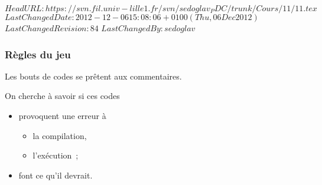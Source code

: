 \svnidlong 
{$HeadURL: https://svn.fil.univ-lille1.fr/svn/sedoglav_PDC/trunk/Cours/11/11.tex $} 
{$LastChangedDate: 2012-12-06 15:08:06 +0100 (Thu, 06 Dec 2012) $} 
{$LastChangedRevision: 84 $} 
{$LastChangedBy: sedoglav $} 
\newcommand{\reponse}[4]{%
  Ce bout de code 
  \begin{itemize}
  \item provoque une erreur \`a
    \begin{itemize}
    \item la compilation~: #1
    \item l'ex\'ecution~: #2
    \end{itemize}
  \item fait ce qu'il devrait~: #3
  \end{itemize}
  #4
}
\newcommand{\suspens}[1]{
  \begin{overprint}
    \onslide<1>
    \reponse{}{}{}{}%
    \onslide<2>
    #1
  \end{overprint}
}
\begin{frame}
  \frametitle{R\`egles du jeu}
   Les bouts de codes se pr\^etent aux commentaires.
   \par
   On cherche \`a savoir si ces codes
  \begin{itemize}
  \item provoquent une erreur \`a
    \begin{itemize}
    \item la compilation,
    \item l'ex\'ecution~; 
    \end{itemize}
  \item font ce qu'il devrait.
  \end{itemize}
\end{frame}
